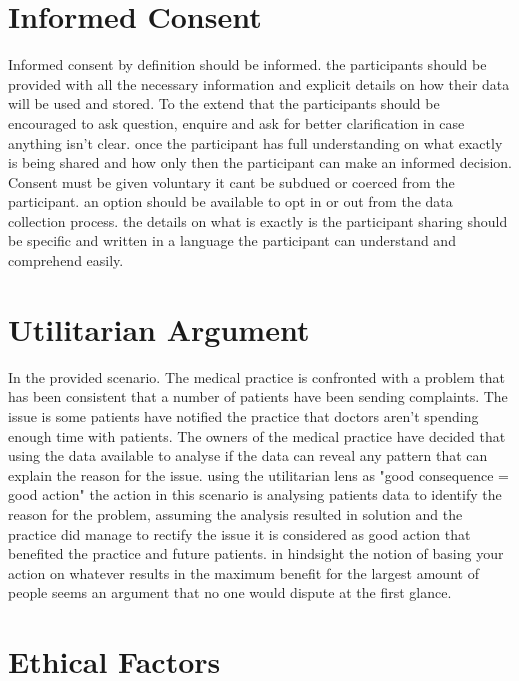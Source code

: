 \documentclass{article}
\begin{document}
	\newpage
\section{Informed Consent}

Informed consent by definition should be informed. the participants should be provided with all the necessary information and explicit details on how their data will be used and stored. To the extend that the participants should be encouraged to ask question, enquire and ask for better clarification in case anything isn't clear. once the participant has full understanding on what exactly is being shared and how only then the participant can make an informed decision. Consent must be given voluntary it cant be subdued or coerced from the participant. an option should be available to opt in or out from the data collection process. the details on what is exactly is the participant sharing should be specific and written in a language the participant can understand and comprehend easily. 


\section{Utilitarian Argument}
In the provided scenario. The medical practice is confronted with a problem that has been consistent that a number of patients have been sending complaints. The issue is some patients have notified the practice that doctors aren't spending enough time with patients. The owners of the medical practice have decided that using the data available to analyse if the data can reveal any pattern that can explain the reason for the issue. using the utilitarian lens as "good consequence = good action" the action in this scenario is analysing patients data to identify the reason for the problem, assuming the analysis resulted in solution and the practice did manage to rectify the issue it is considered as good action that benefited the practice and future patients. in hindsight the notion of basing your action on whatever results in the maximum benefit for the largest amount of people seems an argument that no one would dispute at the first glance. 

\newpage

\section{Ethical Factors}
\end{document}
